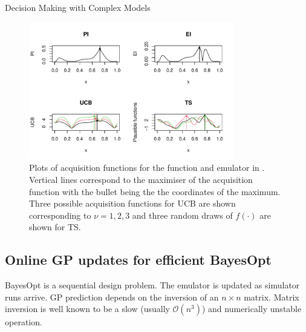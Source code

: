 \begin{chapter}{Decision Making with Complex Models \label{Chap:optimisation}}
\begin{figure}[h]
 \includegraphics[width=0.8\textwidth]{fig-optim/example-acquisitions.pdf}
 \caption{Plots of acquisition functions for the function and emulator in . Vertical lines correspond to the maximiser of the acquisition function with the bullet being the the coordinates of the maximum. Three possible acquisition functions for UCB are shown corresponding to $\nu = 1, 2, 3$ and three random draws of $f(\cdot)$ are shown for TS. \label{Fig:acq-fns}}
\end{figure}
\subsection{Online GP updates for efficient BayesOpt}
BayesOpt is a sequential design problem. The emulator is updated as simulator runs arrive. GP prediction depends on the inversion of an $n \times n$ matrix. Matrix inversion is well known to be a slow (usually $\mathcal{O}(n^3)$) and numerically unstable operation.


\end{chapter}
